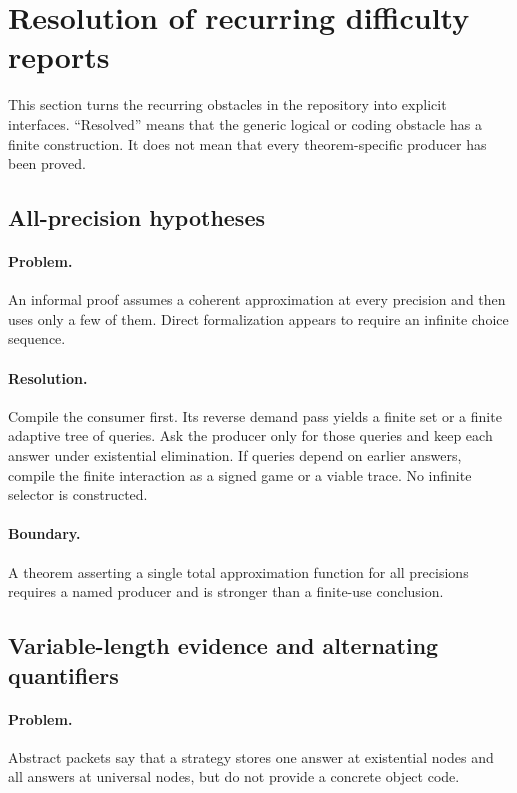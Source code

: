 \section{Resolution of recurring difficulty reports}

This section turns the recurring obstacles in the repository into explicit
interfaces.  ``Resolved'' means that the generic logical or coding obstacle has
a finite construction.  It does not mean that every theorem-specific producer
has been proved.

\subsection{All-precision hypotheses}

\paragraph{Problem.}
An informal proof assumes a coherent approximation at every precision and then
uses only a few of them.  Direct formalization appears to require an infinite
choice sequence.

\paragraph{Resolution.}
Compile the consumer first.  Its reverse demand pass yields a finite set or a
finite adaptive tree of queries.  Ask the producer only for those queries and
keep each answer under existential elimination.  If queries depend on earlier
answers, compile the finite interaction as a signed game or a viable trace.
No infinite selector is constructed.

\paragraph{Boundary.}
A theorem asserting a single total approximation function for all precisions
requires a named producer and is stronger than a finite-use conclusion.

\subsection{Variable-length evidence and alternating quantifiers}

\paragraph{Problem.}
Abstract packets say that a strategy stores one answer at existential nodes and
all answers at universal nodes, but do not provide a concrete object code.

